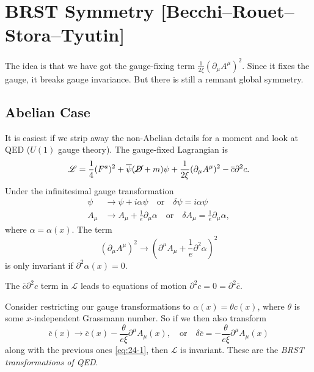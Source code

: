 
\section{BRST Symmetry [Becchi--Rouet--Stora--Tyutin]}%
\label{sec:brst_symmetry_becchi_rouet_stora_tyutin}

The idea is that we have got the gauge-fixing term $\frac{1}{2\xi} (\partial_{\mu} A^{\mu})^2$. Since it fixes the gauge, it breaks gauge invariance.
But there is still a remnant global symmetry.

\subsection{Abelian Case}%
\label{sub:abelian_case}

It is easiest if we strip away the non-Abelian details for a moment and look at QED ($U(1)$ gauge theory).
The gauge-fixed Lagrangian is
\begin{equation}
  \mathscr{L} = \frac{1}{4} (F^{a})^2 + \overline{\psi}{}(\cancel{D} + m) \psi + \frac{1}{2 \xi} (\partial_{\mu} A^{\mu})^2 - \overline{c}{} \partial^2 c.
\end{equation}
Under the infinitesimal gauge transformation
\begin{subequations}
  \label{eq:24-1}
  \begin{align}
    \psi &\to \psi + i \alpha \psi \quad \text{or} \quad \delta \psi = i \alpha \psi \\
    A_{\mu} &\to A_{\mu} + \frac{1}{e} \partial_{\mu} \alpha \quad \text{or} \quad \delta A_{\mu} = \frac{1}{e} \partial_{\mu} \alpha,
  \end{align}
\end{subequations}
where $\alpha = \alpha(x)$. The term
\begin{equation}
  (\partial_{\mu} A^{\mu})^2 \to (\partial^{\mu} A_{\mu} + \frac{1}{e} \partial^2 \alpha)^2
\end{equation}
is only invariant if $\partial^2 \alpha(x) = 0$.
\begin{remark}
  The $\overline{c}{} \partial^2 c$ term in $\mathscr{L}$ leads to equations of motion $\partial^2 c = 0 = \partial^2 \overline{c}{}$.
\end{remark}
Consider restricting our gauge transformations to $\alpha(x) = \theta c(x)$, where $\theta$ is some $x$-independent Grassmann number.  So if we then also transform
\begin{equation}
  \overline{c}{}(x) \to \overline{c}{}(x) - \frac{\theta}{e \xi} \partial^{\mu} A_{\mu}(x), \quad \text{or} \quad \delta \overline{c}{} = -\frac{\theta}{e \xi} \partial^{\mu} A_{\mu}(x)
\end{equation}
along with the previous ones \eqref{eq:24-1}, then $\mathscr{L}$ is invariant.
These are the \emph{BRST transformations of QED}.

